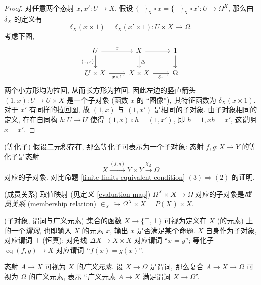 \begin{proof}
	对任意两个态射 $x,x'\colon U\to X$, 假设 $\{-\}_X\circ x = \{-\}_X\circ x'\colon U\to \Omega^X$, 那么由 $\delta_X$ 的定义有
	$$
	\delta_X(x\times 1) = \delta_X(x'\times 1) \colon U\times X \to \Omega.
	$$
	考虑下图,
	\[\begin{tikzcd}[ampersand replacement=\&]
		U \& X \& 1 \\
		{U\times X} \& {X\times X} \& \Omega
		\arrow["{(1,x)}"', from=1-1, to=2-1]
		\arrow["x\times1"', from=2-1, to=2-2]
		\arrow["\Delta", from=1-2, to=2-2]
		\arrow["x", from=1-1, to=1-2]
		\arrow[from=1-2, to=1-3]
		\arrow["{\delta_x}"', from=2-2, to=2-3]
		\arrow[from=1-3, to=2-3]
	\end{tikzcd}\]
	两个小方形均为拉回, 从而长方形为拉回.
	因此左边的竖直箭头 $(1,x)\colon U \to U\times X$ 是一个子对象 (函数 $x$ 的 ``图像''), 其特征函数为 $\delta_X(x\times 1)$.
	对于 $x'$ 有同样的拉回图, 故 $(1,x)$ 与 $(1,x')$ 是相同的子对象. 由子对象相同的定义,
	存在自同构 $h\colon U\to U$ 使得 $(1,x)\circ h = (1,x')$,
	即 $h=1, xh=x'$, 这说明 $x=x'$.
\end{proof}

\begin{example}
    [label={equalizer-as-subobject}]
    {(等化子)}
    假设二元积存在, 那么等化子可表示为一个子对象: 态射 $f,g \colon X \to Y$ 的等化子是态射
$$
X \overset{(f,g)}{\longrightarrow} Y\times Y \overset{\chi_{\Delta}}{\longrightarrow} \Omega
$$
对应的子对象. 对比命题 \ref{finite-limits-equivalent-condition} $(3) \Rightarrow (2)$ 的证明.
\end{example}

\begin{example}
    [label={membership-relation}]
    {(成员关系)}
    取值映射 (见定义 \ref{evaluation-map}) $\Omega^X \times X \to \Omega$ 对应的子对象是\emph{成员关系} (membership relation) $\in_X \hookrightarrow \Omega^X \times X = P(X) \times X$.
\end{example}

\begin{remark}
    {(子对象, 谓词与广义元素)}
    集合的函数 $X \to \{\top,\bot\}$ 可视为定义在 $X$ (的元素) 上的一个\emph{谓词}, 也即输入 $X$ 的元素 $x$, 输出 $x$ 是否满足某个命题. %
    $X$ 自身作为子对象, 对应谓词 $\top$ (恒真);
    对角线 $\Delta X\to X\times X$ 对应谓词 ``$x=y$'';
    等化子 $\operatorname{eq}(f,g) \to X$ 对应谓词 ``$f(x)=g(x)$''.

    态射 $A \to X$ 可视为 $X$ 的\emph{广义元素}. 设 $X \to \Omega$ 是谓词, 那么复合 $A \to X \to \Omega$ 可视为 $\Omega$ 的广义元素, 表示 ``广义元素 $A \to X$ 满足谓词 $X\to\Omega$''.
\end{remark}

